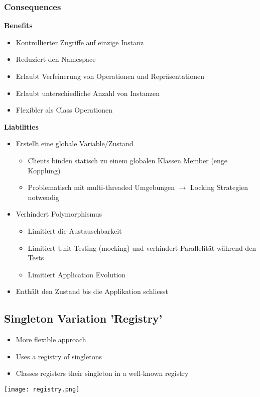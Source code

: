 \subsubsection{Consequences}
\textbf{Benefits}
\begin{itemize}
    \item Kontrollierter Zugriffe auf einzige Instanz
    \item Reduziert den Namespace
    \item Erlaubt Verfeinerung von Operationen und Repräsentationen
    \item Erlaubt unterschiedliche Anzahl von Instanzen
    \item Flexibler als Class Operationen
\end{itemize}
\vspace{10pt}
\textbf{Liabilities}
\begin{itemize}
    \item Erstellt eine globale Variable/Zustand
    \begin{itemize}
        \item Clients binden statisch zu einem globalen Klassen Member (enge Kopplung)
        \item Problematisch mit multi-threaded Umgebungen $\rightarrow$ Locking Strategien notwendig
    \end{itemize}
    \item Verhindert Polymorphismus
    \begin{itemize}
        \item Limitiert die Austauschbarkeit
        \item Limitiert Unit Testing (mocking) und verhindert Parallelität während den Tests
        \item Limitiert Application Evolution
    \end{itemize}
    \item Enthält den Zustand bis die Applikation schliesst
\end{itemize}

\vfill\null
\columnbreak

\subsection{Singleton Variation 'Registry'}
\begin{itemize}
    \item More flexible approach
    \item Uses a registry of singletons
    \item Classes registers their singleton in a well-known registry
\end{itemize}
\texttt{[image: registry.png]}

